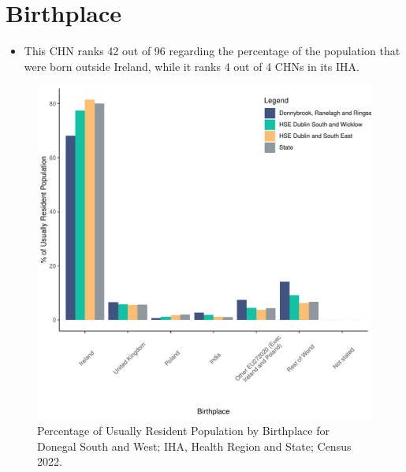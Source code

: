 \documentclass{article}
\begin{document}
\section{Birthplace}\label{sect:Birth}
\begin{itemize}
\item This CHN ranks  42 out of 96 regarding the percentage of the population that were born outside Ireland, while it ranks  4 out of 4 CHNs in its IHA.
\end{itemize}
\begin{figure}[H]
	\centering
	\includegraphics[width = 130mm]{../figures/BirthED.pdf}
	\caption{Percentage of Usually Resident Population by Birthplace for Donegal South and West; IHA, Health Region and State; Census 2022.}
	\label{fig:vbnv}
	\end{figure}
	
\end{document}
